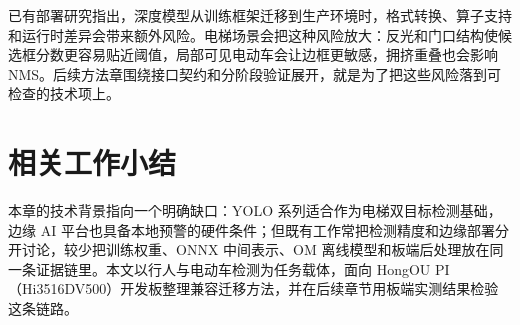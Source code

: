 已有部署研究指出，深度模型从训练框架迁移到生产环境时，格式转换、算子支持和运行时差异会带来额外风险\cite{stacker2021deployment,chen2021aqd}。电梯场景会把这种风险放大：反光和门口结构使候选框分数更容易贴近阈值，局部可见电动车会让边框更敏感，拥挤重叠也会影响 NMS。后续方法章围绕接口契约和分阶段验证展开，就是为了把这些风险落到可检查的技术项上。

\section{相关工作小结}

本章的技术背景指向一个明确缺口：YOLO 系列适合作为电梯双目标检测基础，边缘 AI 平台也具备本地预警的硬件条件；但既有工作常把检测精度和边缘部署分开讨论，较少把训练权重、ONNX 中间表示、OM 离线模型和板端后处理放在同一条证据链里。本文以行人与电动车检测为任务载体，面向 HongOU PI（Hi3516DV500）开发板整理兼容迁移方法，并在后续章节用板端实测结果检验这条链路。
